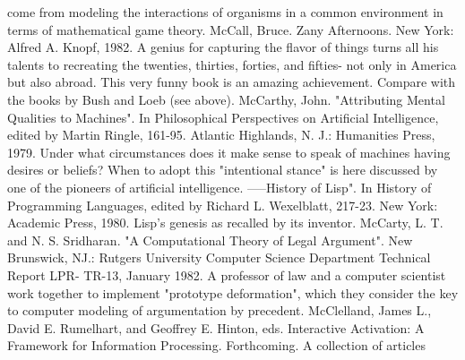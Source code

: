   come from modeling the interactions of organisms in a common environment in terms of
  mathematical game theory.
McCall, Bruce. Zany Afternoons. New York: Alfred A. Knopf, 1982. A genius for capturing
  the flavor of things turns all his talents to recreating the twenties, thirties, forties, and fifties-
  not only in America but also abroad. This very funny book is an amazing achievement.
  Compare with the books by Bush and Loeb (see above).
McCarthy, John. "Attributing Mental Qualities to Machines". In Philosophical Perspectives
  on Artificial Intelligence, edited by Martin Ringle, 161-95. Atlantic Highlands, N. J.:
  Humanities Press, 1979. Under what circumstances does it make sense to speak of machines
  having desires or beliefs? When to adopt this "intentional stance" is here discussed by one
  of the pioneers of artificial intelligence.
-----History of Lisp". In History of Programming Languages, edited by Richard L.
  Wexelblatt, 217-23. New York: Academic Press, 1980. Lisp's genesis as recalled by its
  inventor.
McCarty, L. T. and N. S. Sridharan. "A Computational Theory of Legal Argument". New
  Brunswick, NJ.: Rutgers University Computer Science Department Technical Report LPR-
  TR-13, January 1982. A professor of law and a computer scientist work together to
  implement "prototype deformation", which they consider the key to computer modeling of
  argumentation by precedent.
McClelland, James L., David E. Rumelhart, and Geoffrey E. Hinton, eds. Interactive
  Activation: A Framework for Information Processing. Forthcoming. A collection of articles


